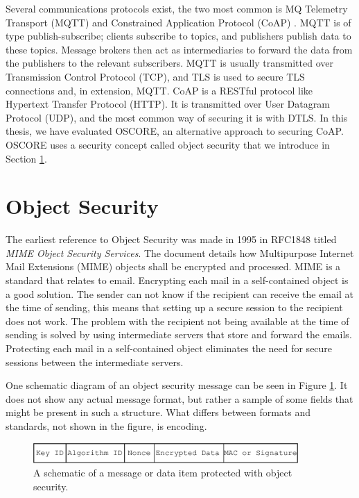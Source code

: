 Several communications protocols exist, the two most common is MQ Telemetry Transport (MQTT) \cite{hunkeler2008mqtt} and Constrained Application Protocol (CoAP) \cite{rfc7252}. MQTT is of type publish-subscribe; clients subscribe to topics, and publishers publish data to these topics. Message brokers then act as intermediaries to forward the data from the publishers to the relevant subscribers.
MQTT is usually transmitted over Transmission Control Protocol (TCP), and TLS is used to secure TLS connections and, in extension, MQTT.
CoAP is a RESTful protocol like Hypertext Transfer Protocol (HTTP). It is transmitted over User Datagram Protocol (UDP), and the most common way of securing it is with DTLS. In this thesis, we have evaluated OSCORE, an alternative approach to securing CoAP. OSCORE uses a security concept called object security that we introduce in Section \ref{sec:object_security}.

\section{Object Security}
\label{sec:object_security}
The earliest reference to Object Security was made in 1995 in RFC1848 \cite{RFC1848} titled \textit{MIME Object Security Services}. The document details how Multipurpose Internet Mail Extensions (MIME) objects shall be encrypted and processed. MIME is a standard that relates to email. Encrypting each mail in a self-contained object is a good solution. The sender can not know if the recipient can receive the email at the time of sending, this means that setting up a secure session to the recipient does not work. The problem with the recipient not being available at the time of sending is solved by using intermediate servers that store and forward the emails. Protecting each mail in a self-contained object eliminates the need for secure sessions between the intermediate servers.

One schematic diagram of an object security message can be seen in Figure \ref{fig:object-security}. It does not show any actual message format, but rather a sample of some fields that might be present in such a structure. What differs between formats and standards, not shown in the figure, is encoding. 

\begin{figure}[ht]
\centering
\includegraphics[width=0.9\textwidth]{images/object_security.pdf}
\caption{A schematic of a message or data item protected with object security.}
\label{fig:object-security}
\end{figure}


